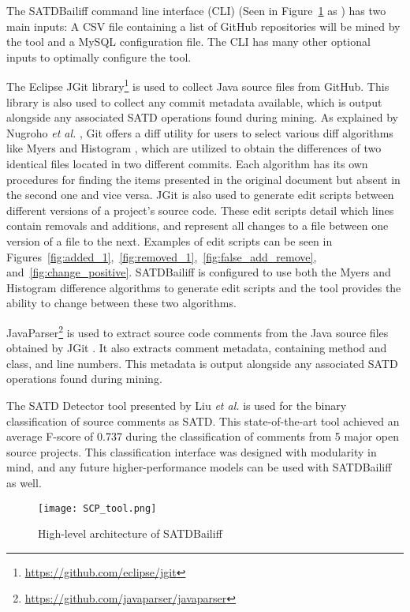 \documentclass[3p]{elsarticle}
\newcommand{\approach}{SATDBailiff\xspace}
\newcommand*\circled[1]{\tikz[baseline=(char.base)]{
            \node[shape=circle,draw,inner sep=2pt] (char) {#1};}}
\begin{document}
The \approach command line interface (CLI) (Seen in Figure~\ref{fig:flow} as \circled{1}) has two main inputs: A CSV file containing a list of GitHub repositories will be mined by the tool and a MySQL configuration file. The CLI has many other optional inputs to optimally configure the tool.

The Eclipse JGit library\footnote{\url{https://github.com/eclipse/jgit}} \circled{3} is used to collect Java source files from GitHub. This library is also used to collect any commit metadata available, which is output alongside any associated SATD operations found during mining. As explained by Nugroho \textit{et al.} \cite{nugroho2020different}, Git offers a diff utility for users to select various diff algorithms like Myers \cite{Myers} and Histogram \cite{Histogram}, which are utilized to obtain the differences of two identical files located in two different commits. Each algorithm has its own procedures for finding the items presented in the original document but absent in the second one and vice versa. JGit is also used to generate edit scripts between different versions of a project's source code. These edit scripts detail which lines contain removals and additions, and represent all changes to a file between one version of a file to the next. Examples of edit scripts can be seen in Figures~\ref{fig:added_1},~\ref{fig:removed_1},~\ref{fig:false_add_remove}, and~\ref{fig:change_positive}. \approach is configured to use both the Myers \cite{Myers}  and Histogram \cite{Histogram} difference algorithms to generate edit scripts and the tool provides the ability to change between these two algorithms.

JavaParser\footnote{\url{https://github.com/javaparser/javaparser}} \circled{4} is used to extract source code comments from the Java source files obtained by JGit \circled{3}. It also extracts comment metadata, containing method and class, and line numbers. This metadata is output alongside any associated SATD operations found during mining.

The SATD Detector tool presented by Liu \textit{et al.} \cite{liu2018satd} \circled{5} is used for the binary classification of source comments as SATD. This state-of-the-art tool achieved an average F-score of 0.737 during the classification of comments from 5 major open source projects. This classification interface was designed with modularity in mind, and any future higher-performance models can be used with \approach as well.

\begin{figure}
    \centering
    \texttt{[image: SCP\_tool.png]}
    \caption{High-level architecture of \approach}
    \label{fig:flow}
\end{figure}
\end{document}
